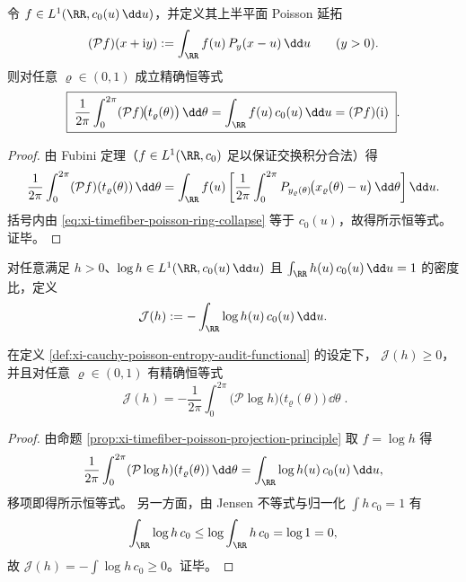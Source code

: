 \begin{proposition}\label{prop:xi-timefiber-poisson-projection-principle}
令 \(f\in L^1(\RR,c_0(u)\,\dd u)\)，并定义其上半平面 Poisson 延拓
\[
(\mathcal P f)(x+\mathrm{i}y):=\int_{\RR} f(u)\,P_y(x-u)\,\dd u
\qquad (y>0).
\]
则对任意 \(\varrho\in(0,1)\) 成立精确恒等式
\[
\boxed{\;
\frac{1}{2\pi}\int_{0}^{2\pi}(\mathcal P f)\!\bigl(t_\varrho(\theta)\bigr)\,\dd\theta
=\int_{\RR}f(u)\,c_0(u)\,\dd u
=(\mathcal P f)(\mathrm{i})\; }.
\]
\end{proposition}

\begin{proof}
由 Fubini 定理（\(f\in L^1(\RR,c_0)\) 足以保证交换积分合法）得
\[
\frac{1}{2\pi}\int_{0}^{2\pi}(\mathcal P f)(t_\varrho(\theta))\,\dd\theta
=\int_{\RR} f(u)\left[\frac{1}{2\pi}\int_{0}^{2\pi}P_{y_\varrho(\theta)}\!\bigl(x_\varrho(\theta)-u\bigr)\,\dd\theta\right]\dd u.
\]
括号内由 \eqref{eq:xi-timefiber-poisson-ring-collapse} 等于 \(c_0(u)\)，故得所示恒等式。证毕。
\end{proof}

\begin{definition}[熵型审计泛函]\label{def:xi-cauchy-poisson-entropy-audit-functional}
对任意满足 \(h>0\)、\(\log h\in L^1(\RR,c_0(u)\,\dd u)\) 且 \(\int_{\RR}h(u)\,c_0(u)\,\dd u=1\) 的密度比，定义
\[
\mathcal J(h):=-\int_{\RR}\log h(u)\,c_0(u)\,\dd u.
\]
\end{definition}

\begin{proposition}[共动圆审计表达式]\label{prop:xi-cauchy-poisson-entropy-audit-circle-average}
在定义 \ref{def:xi-cauchy-poisson-entropy-audit-functional} 的设定下，
\(\mathcal J(h)\ge 0\)，并且对任意 \(\varrho\in(0,1)\) 有精确恒等式
\[
\boxed{\;
\mathcal J(h)
=-\frac{1}{2\pi}\int_{0}^{2\pi}\bigl(\mathcal P\log h\bigr)\!\bigl(t_\varrho(\theta)\bigr)\,\dd\theta\; }.
\]
\end{proposition}
\begin{proof}
由命题 \ref{prop:xi-timefiber-poisson-projection-principle} 取 \(f=\log h\) 得
\[
\frac{1}{2\pi}\int_{0}^{2\pi}(\mathcal P\log h)(t_\varrho(\theta))\,\dd\theta
=\int_{\RR}\log h(u)\,c_0(u)\,\dd u,
\]
移项即得所示恒等式。
另一方面，由 Jensen 不等式与归一化 \(\int h\,c_0=1\) 有
\[
\int_{\RR}\log h\,c_0
\le \log\int_{\RR}h\,c_0=\log 1=0,
\]
故 \(\mathcal J(h)=-\int \log h\,c_0\ge 0\)。证毕。
\end{proof}

\endinput
